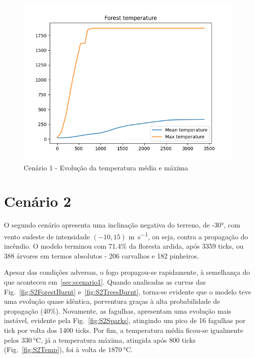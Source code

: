 \begin{figure}[H]
    \centering
    \includegraphics[width=\textwidth]{../src/runs/scenario1/temperature}
    \caption{Cenário 1 - Evolução da temperatura média e máxima}
    \label{fig:S1Temp}
\end{figure}


\section{Cenário 2}\label{sec:scenario2}

O segundo cenário apresenta uma inclinação negativa do terreno, de \ang{-30}, com vento sudeste de intensidade $(-10, 15)$ \si{\meter\per\second}, ou seja, contra a propagação do incêndio.
O modelo terminou com 71.4\% da floresta ardida, após 3359 ticks, ou 388 árvores em termos absolutos - 206 carvalhos e 182 pinheiros.

Apesar das condições adversas, o fogo propagou-se rapidamente, à semelhança do que aconteceu em~\ref{sec:scenario1}.
Quando analisadas as curvas das Fig.~\ref{fig:S2ForestBurnt} e~\ref{fig:S2TreesBurnt}, torna-se evidente que o modelo teve uma evolução quase idêntica, porventura graças à alta probabilidade de propagação (40\%). Novamente, as fagulhas, apresentam uma evolução mais instável, evidente pela Fig.~\ref{fig:S2Sparks}, atingindo um pico de 16 fagulhas por tick por volta dos 1400 ticks.
Por fim, a temperatura média ficou-se igualmente pelos $\SI{330}{\degreeCelsius}$, já a temperatura máxima, atingida após 800 ticks (Fig.~\ref{fig:S2Temp}), foi à volta de $\SI{1870}{\degreeCelsius}$.

